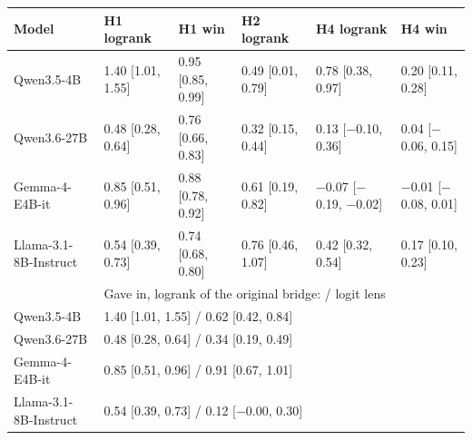 \begin{tabular}{llllll}
\toprule
Model & H1 logrank & H1 win & H2 logrank & H4 logrank & H4 win \\
\midrule
Qwen3.5-4B & 1.40 [1.01, 1.55] & 0.95 [0.85, 0.99] & 0.49 [0.01, 0.79] & 0.78 [0.38, 0.97] & 0.20 [0.11, 0.28] \\
Qwen3.6-27B & 0.48 [0.28, 0.64] & 0.76 [0.66, 0.83] & 0.32 [0.15, 0.44] & 0.13 [$-$0.10, 0.36] & 0.04 [$-$0.06, 0.15] \\
Gemma-4-E4B-it & 0.85 [0.51, 0.96] & 0.88 [0.78, 0.92] & 0.61 [0.19, 0.82] & $-$0.07 [$-$0.19, $-$0.02] & $-$0.01 [$-$0.08, 0.01] \\
Llama-3.1-8B-Instruct & 0.54 [0.39, 0.73] & 0.74 [0.68, 0.80] & 0.76 [0.46, 1.07] & 0.42 [0.32, 0.54] & 0.17 [0.10, 0.23] \\
\midrule
 & \multicolumn{5}{l}{Gave in, logrank of the original bridge: \jlens{} / logit lens} \\
Qwen3.5-4B & \multicolumn{5}{l}{1.40 [1.01, 1.55] / 0.62 [0.42, 0.84]} \\
Qwen3.6-27B & \multicolumn{5}{l}{0.48 [0.28, 0.64] / 0.34 [0.19, 0.49]} \\
Gemma-4-E4B-it & \multicolumn{5}{l}{0.85 [0.51, 0.96] / 0.91 [0.67, 1.01]} \\
Llama-3.1-8B-Instruct & \multicolumn{5}{l}{0.54 [0.39, 0.73] / 0.12 [$-$0.00, 0.30]} \\
\bottomrule
\end{tabular}
